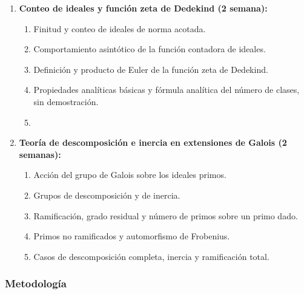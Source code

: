 \begin{refsection}
\begin{enumerate}
\item \textbf{Conteo de ideales y función zeta de Dedekind (2 semana):}
\begin{enumerate}
\item Finitud y conteo de ideales de norma acotada.
\item Comportamiento asintótico de la función contadora de ideales.
\item Definición y producto de Euler de la función zeta de Dedekind.
\item Propiedades analíticas básicas y fórmula analítica del número de clases, sin demostración.
\item 
\end{enumerate}

\item \textbf{Teoría de descomposición e inercia en extensiones de Galois (2 semanas):}
\begin{enumerate}
\item Acción del grupo de Galois sobre los ideales primos.
\item Grupos de descomposición y de inercia.
\item Ramificación, grado residual y número de primos sobre un primo dado.
\item Primos no ramificados y automorfismo de Frobenius.
\item Casos de descomposición completa, inercia y ramificación total.
\end{enumerate}



\end{enumerate}



\subsubsection*{Metodología}


\end{refsection}

